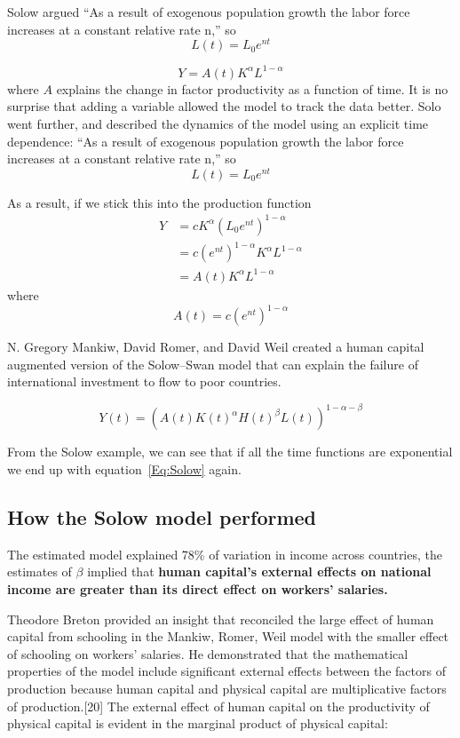 Solow argued ``As a result of exogenous population growth the labor force increases at a constant relative rate n,'' so
  \[L(t)= L_0e^{nt}\]


 \[Y=A(t)K^\alpha L^{1-\alpha}\]
 where $A$  explains the change in factor productivity as a function of time. It is no surprise that adding a variable allowed the model to track the data better. Solo went further, and described the dynamics of the model using an explicit time dependence: ``As a result of exogenous population growth the labor force increases at a constant relative rate n,'' so
  \[L(t)= L_0e^{nt}\]
  
  
 As a result, if we stick this into the production function 
 \begin{eqnarray}
 Y&=cK^\alpha (L_0e^{nt})^{1-\alpha}\\
    &=c(e^{nt})^{1-\alpha}K^\alpha L^{1-\alpha}\\
    &=A(t)K^\alpha L^{1-\alpha} \label{Eq:Solow}
 \end{eqnarray}
 where
 \[A(t)=c(e^{nt})^{1-\alpha}\]
 
 N. Gregory Mankiw, David Romer, and David Weil created a human capital augmented version of the Solow–Swan model that can explain the failure of international investment to flow to poor countries.

    \[Y(t)=(A(t)K(t)^\alpha H(t)^\beta L(t))^{1-\alpha -\beta} \]
    
    From the Solow example, we can see that if all the time functions are exponential we end up with equation~\ref{Eq:Solow} again.
    
\subsection{How the Solow model performed}    
The estimated model explained 78\% of variation in income across countries, the estimates of $\beta$ implied that \textbf{ human capital's external effects on national income are greater than its direct effect on workers' salaries.}%
    
Theodore Breton provided an insight that reconciled the large effect of human capital from schooling in the Mankiw, Romer, Weil model with the smaller effect of schooling on workers' salaries. He demonstrated that the mathematical properties of the model include significant external effects between the factors of production because human capital and physical capital are multiplicative factors of production.[20] The external effect of human capital on the productivity of physical capital is evident in the marginal product of physical capital:

